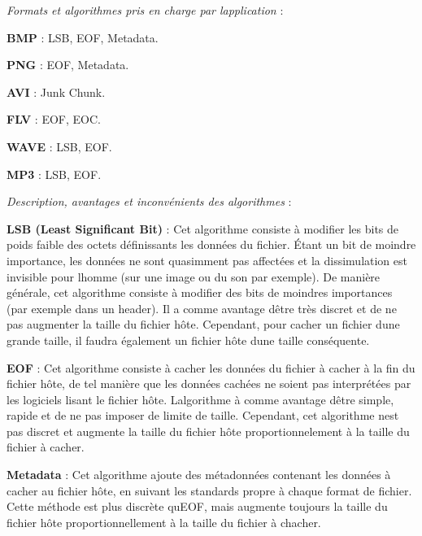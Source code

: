 \begin{DoxyItemize}
\item {\itshape Formats et algorithmes pris en charge par l\textquotesingle{}application} \+:
\begin{DoxyItemize}
\item {\bfseries B\+MP} \+: L\+SB, E\+OF, Metadata.
\item {\bfseries P\+NG} \+: E\+OF, Metadata.
\item {\bfseries A\+VI} \+: Junk Chunk.
\item {\bfseries F\+LV} \+: E\+OF, E\+OC.
\item {\bfseries W\+A\+VE} \+: L\+SB, E\+OF.
\item {\bfseries M\+P3} \+: L\+SB, E\+OF.
\end{DoxyItemize}
\item {\itshape Description, avantages et inconvénients des algorithmes} \+:
\begin{DoxyItemize}
\item {\bfseries L\+SB (Least Significant Bit)} \+: Cet algorithme consiste à modifier les bits de poids faible des octets définissants les données du fichier. Étant un bit de moindre importance, les données ne sont quasimment pas affectées et la dissimulation est invisible pour l\textquotesingle{}homme (sur une image ou du son par exemple). De manière générale, cet algorithme consiste à modifier des bits de moindres importances (par exemple dans un header). Il a comme avantage d\textquotesingle{}être très discret et de ne pas augmenter la taille du fichier hôte. Cependant, pour cacher un fichier d\textquotesingle{}une grande taille, il faudra également un fichier hôte d\textquotesingle{}une taille conséquente.
\item {\bfseries E\+OF} \+: Cet algorithme consiste à cacher les données du fichier à cacher à la fin du fichier hôte, de tel manière que les données cachées ne soient pas interprétées par les logiciels lisant le fichier hôte. L\textquotesingle{}algorithme à comme avantage d\textquotesingle{}être simple, rapide et de ne pas imposer de limite de taille. Cependant, cet algorithme n\textquotesingle{}est pas discret et augmente la taille du fichier hôte proportionnelement à la taille du fichier à cacher.
\item {\bfseries Metadata} \+: Cet algorithme ajoute des métadonnées contenant les données à cacher au fichier hôte, en suivant les standards propre à chaque format de fichier. Cette méthode est plus discrète qu\textquotesingle{}E\+OF, mais augmente toujours la taille du fichier hôte proportionnellement à la taille du fichier à chacher.

\end{DoxyItemize}
\end{DoxyItemize}
